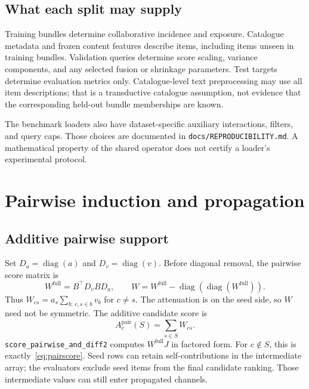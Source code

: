 \documentclass[11pt,a4paper]{article}
\theoremstyle{remark}
\newcommand{\diag}{\operatorname{diag}}
\newcommand{\code}[1]{\texttt{\small #1}}
\begin{document}
\subsection{What each split may supply}
Training bundles determine collaborative incidence and exposure. Catalogue
metadata and frozen content features describe items, including items unseen
in training bundles. Validation queries determine score scaling, variance
components, and any selected fusion or shrinkage parameters. Test targets
determine evaluation metrics only. Catalogue-level text preprocessing may
use all item descriptions; that is a transductive catalogue assumption,
not evidence that the corresponding held-out bundle memberships are known.

The benchmark loaders also have dataset-specific auxiliary interactions,
filters, and query caps. Those choices are documented in
\code{docs/REPRODUCIBILITY.md}. A mathematical property of the shared operator
does not certify a loader's experimental protocol.

\section{Pairwise induction and propagation}
\subsection{Additive pairwise support}
Set $D_a=\diag(a)$ and $D_v=\diag(v)$. Before diagonal removal, the
pairwise score matrix is
\begin{equation}
 W^{\mathrm{full}}=B^\top D_v B D_a,
 \qquad W=W^{\mathrm{full}}-\diag(\diag(W^{\mathrm{full}})).
 \label{eq:pairgraph}
\end{equation}
Thus $W_{cs}=a_s\sum_{b:\,c,s\in b}v_b$ for $c\neq s$. The attenuation
is on the seed side, so $W$ need not be symmetric. The additive candidate
score is
\begin{equation}
 A^{\mathrm{pair}}_c(S)=\sum_{s\in S}W_{cs}.
 \label{eq:pairscore}
\end{equation}
\code{score\_pairwise\_and\_diff2} computes $W^{\mathrm{full}}J$ in
factored form. For $c\notin S$, this is exactly~\eqref{eq:pairscore}.
Seed rows can retain self-contributions in the intermediate array; the
evaluators exclude seed items from the final candidate ranking. Those
intermediate values can still enter propagated channels.
\end{document}
